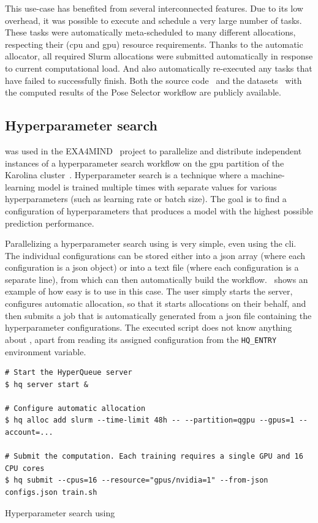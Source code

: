 This use-case has benefited from several interconnected \hyperqueue{} features. Due to
its low overhead, it was possible to execute and schedule a very large number of tasks. These tasks
were automatically meta-scheduled to many different allocations, respecting their
(\gls{cpu} and \gls{gpu}) resource requirements. Thanks to the
automatic allocator, all required Slurm allocations were submitted automatically in response to
current computational load. And \hyperqueue{} also automatically re-executed any tasks
that have failed to successfully finish. Both the source code~\cite{ps-workflow} and the
datasets~\cite{ps_dataset_1,ps_dataset_2} with the computed results of the Pose Selector workflow are
publicly available.

\subsection{Hyperparameter search}
\hyperqueue{} was used in the EXA4MIND~\cite{exa4mind} project to parallelize and
distribute independent instances of a hyperparameter search workflow on the \gls{gpu}
partition of the Karolina cluster~\cite{karolina}. Hyperparameter search is a technique
where a machine-learning model is trained multiple times with separate values for various
hyperparameters (such as learning rate or batch size). The goal is to find a configuration of
hyperparameters that produces a model with the highest possible prediction performance.

Parallelizing a hyperparameter search using \hyperqueue{} is very simple, even using the
\gls{cli}. The individual configurations can be stored either into a
\gls{json} array (where each configuration is a \gls{json} object) or
into a text file (where each configuration is a separate line), from which \hq{}
can then automatically build the workflow.~ shows an example of how easy is
to use \hq{} in this case. The user simply starts the server, configures
automatic allocation, so that it starts allocations on their behalf, and then submits a job that is
automatically generated from a \gls{json} file containing the hyperparameter
configurations. The executed script does not know anything about \hyperqueue{}, apart
from reading its assigned configuration from the \texttt{HQ\_ENTRY} environment variable.

\begin{listing}[h]
	\begin{verbatim}
# Start the HyperQueue server
$ hq server start &

# Configure automatic allocation
$ hq alloc add slurm --time-limit 48h -- --partition=qgpu --gpus=1 --account=...

# Submit the computation. Each training requires a single GPU and 16 CPU cores
$ hq submit --cpus=16 --resource="gpus/nvidia=1" --from-json configs.json train.sh
	\end{verbatim}
	\caption{Hyperparameter search using \hyperqueue{}}
	\label{lst:hq-exa4mind-hyperparameter-search}
\end{listing}

